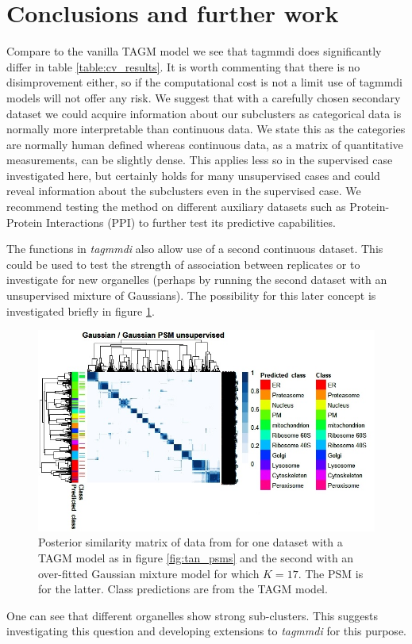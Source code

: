 \documentclass[11pt]{article} %
\begin{document}
\section{Conclusions and further work}
Compare to the vanilla TAGM model we see that tagmmdi does significantly differ in table \ref{table:cv_results}. It is worth commenting that there is no disimprovement either, so if the computational cost is not a limit use of tagmmdi models will not offer any risk. We suggest that with a carefully chosen secondary dataset we could acquire information about our subclusters as categorical data is normally more interpretable than continuous data. We state this as the categories are normally human defined whereas continuous data, as a matrix of quantitative measurements, can be slightly dense. This applies less so in the supervised case investigated here, but certainly holds for many unsupervised cases and could reveal information about the subclusters even in the supervised case. We recommend testing the method on different auxiliary datasets such as Protein-Protein Interactions (PPI) to further test its predictive capabilities.

The functions in \emph{tagmmdi} also allow use of a second continuous dataset. This could be used to test the strength of association between replicates or to investigate for new organelles (perhaps by running the second dataset with an unsupervised mixture of Gaussians). The possibility for this later concept is investigated briefly in figure \ref{fig:g_g_psm}.

\begin{figure}[h]
\centering
\includegraphics[scale=0.9]{tan_tan_unsupervised_with_prediction_edit}
\caption{Posterior similarity matrix of data from \citet{TanMappingOrganelleProteins2009a} for one dataset with a TAGM model as in figure  \ref{fig:tan_psms} and the second with an over-fitted Gaussian mixture model for which $K=17$. The PSM is for the latter. Class predictions are from the TAGM model.}
\label{fig:g_g_psm}
\end{figure}
One can see that different organelles show strong sub-clusters. This suggests investigating this question and developing extensions to \emph{tagmmdi} for this purpose.
\end{document}
